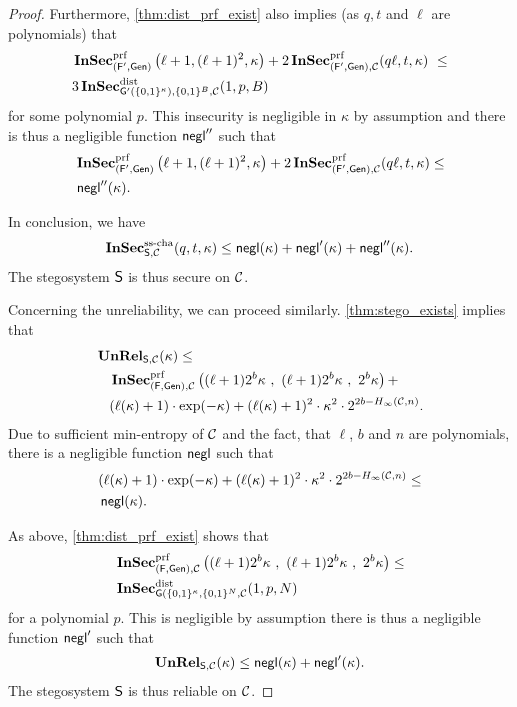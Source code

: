 \begin{proof}
Furthermore, \autoref{thm:dist_prf_exist} also implies (as $q,t$ and
$\ell$ are polynomials) that
\begin{align*}
  &\InSec^{\prf}_{(\algf',\Gen)}\left(\ell+1,(\ell+1)^{2},\kappa\right)+2\InSec^{\prf}_{(\algf',\Gen),\chan}(q\ell,t,\kappa)\ \leq\\
  &3\InSec^{\dist}_{\algo{G'}(\{0,1\}^{\kappa}),\{0,1\}^{B},\chan}(1,p,B)
\end{align*}
for some polynomial $p$. 
This insecurity is negligible in $\kappa$ by assumption and there is
thus a negligible function $\operatorname{\mathsf{negl}}''$ such that
\begin{align*}
  &\operatorname{\mathbf{InSec}}^{\operatorname{prf}}_{(\operatorname{\mathsf{F}}',\operatorname{\mathsf{Gen}})}\left(\ell+1,(\ell+1)^{2},\kappa\right)+2\operatorname{\mathbf{InSec}}^{\operatorname{prf}}_{(\operatorname{\mathsf{F}}',\operatorname{\mathsf{Gen}}),\mathcal{C}}(q\ell,t,\kappa)\leq\\
  &\operatorname{\mathsf{negl}}''(\kappa).
\end{align*}

In conclusion, we have
\begin{align*}
  \operatorname{\mathbf{InSec}}^{\operatorname{ss-cha}}_{\operatorname{\mathsf{S}},\mathcal{C}}(q,t,\kappa)\leq \operatorname{\mathsf{negl}}(\kappa)+\operatorname{\mathsf{negl}}'(\kappa)+\operatorname{\mathsf{negl}}''(\kappa).
\end{align*}
The stegosystem $\operatorname{\mathsf{S}}$ is thus secure on $\mathcal{C}$.

Concerning the unreliability, we can proceed similarly. 
\autoref{thm:stego_exists} implies that
    \begin{align*}
      &\unrel_{\Steg,\chan}(\kappa) \leq\\
       &\quad
         \InSec^{\prf}_{(\algf,\Gen),\chan}\left((\ell+1)2^{b}\kappa\ ,\ (\ell+1)2^{b}
        \kappa\ ,\ 2^{b}\kappa\right)+\\
      &\quad  (\ell(\kappa)+1)\cdot \exp(-\kappa)+(\ell(\kappa)+1)^{2} \cdot
        \kappa^{2}\cdot  2^{2b-\minent(\chan,n)}.
    \end{align*}
Due to sufficient min-entropy of $\mathcal{C}$ and the fact, that
$\ell$, $b$ and $n$ are polynomials, there is a negligible
function $\operatorname{\mathsf{negl}}$ such that
\begin{align*}
      & (\ell(\kappa)+1)\cdot \exp(-\kappa)+(\ell(\kappa)+1)^{2} \cdot
        \kappa^{2}\cdot  2^{2b-H_{\infty}(\mathcal{C},n)}\leq \\
  &\operatorname{\mathsf{negl}}(\kappa).
\end{align*}

 As above, \autoref{thm:dist_prf_exist} shows that
 \begin{align*}
   &\InSec^{\prf}_{(\algf,\Gen),\chan}\left((\ell+1)2^{b}\kappa\ ,\ (\ell+1)2^{b}
     \kappa\ ,\ 2^{b}\kappa\right)\leq\\
   &\InSec^{\dist}_{\algo{G}(\{0,1\}^{\kappa},\{0,1\}^{N},\chan}(1,p,N)
 \end{align*}
 for a polynomial $p$.  This is negligible by assumption
there is thus a negligible function $\operatorname{\mathsf{negl}}'$
such that
\begin{align*}
  \operatorname{\mathbf{UnRel}}_{\operatorname{\mathsf{S}},\mathcal{C}}(\kappa)\leq \operatorname{\mathsf{negl}}(\kappa)+\operatorname{\mathsf{negl}}'(\kappa). 
\end{align*}
The stegosystem $\operatorname{\mathsf{S}}$ is thus reliable on $\mathcal{C}$.


\end{proof}
